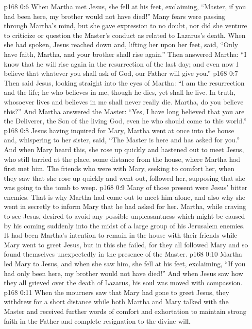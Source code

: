 \vs p168 0:6 When Martha met Jesus, she fell at his feet, exclaiming, “Master, if you had been here, my brother would not have died!” Many fears were passing through Martha’s mind, but she gave expression to no doubt, nor did she venture to criticize or question the Master’s conduct as related to Lazarus’s death. When she had spoken, Jesus reached down and, lifting her upon her feet, said, \textcolor{ubdarkred}{“Only have faith, Martha, and your brother shall rise again.”} Then answered Martha: “I know that he will rise again in the resurrection of the last day; and even now I believe that whatever you shall ask of God, our Father will give you.”
\vs p168 0:7 Then said Jesus, looking straight into the eyes of Martha: \textcolor{ubdarkred}{“I am the resurrection and the life; he who believes in me, though he dies, yet shall he live. In truth, whosoever lives and believes in me shall never really die. Martha, do you believe this?”} And Martha answered the Master: “Yes, I have long believed that you are the Deliverer, the Son of the living God, even he who should come to this world.”
\vs p168 0:8 Jesus having inquired for Mary, Martha went at once into the house and, whispering to her sister, said, “The Master is here and has asked for you.” And when Mary heard this, she rose up quickly and hastened out to meet Jesus, who still tarried at the place, some distance from the house, where Martha had first met him. The friends who were with Mary, seeking to comfort her, when they saw that she rose up quickly and went out, followed her, supposing that she was going to the tomb to weep.
\vs p168 0:9 Many of those present were Jesus’ bitter enemies. That is why Martha had come out to meet him alone, and also why she went in secretly to inform Mary that he had asked for her. Martha, while craving to see Jesus, desired to avoid any possible unpleasantness which might be caused by his coming suddenly into the midst of a large group of his Jerusalem enemies. It had been Martha’s intention to remain in the house with their friends while Mary went to greet Jesus, but in this she failed, for they all followed Mary and so found themselves unexpectedly in the presence of the Master.
\vs p168 0:10 Martha led Mary to Jesus, and when she saw him, she fell at his feet, exclaiming, “If you had only been here, my brother would not have died!” And when Jesus saw how they all grieved over the death of Lazarus, his soul was moved with compassion.
\vs p168 0:11 When the mourners saw that Mary had gone to greet Jesus, they withdrew for a short distance while both Martha and Mary talked with the Master and received further words of comfort and exhortation to maintain strong faith in the Father and complete resignation to the divine will.
